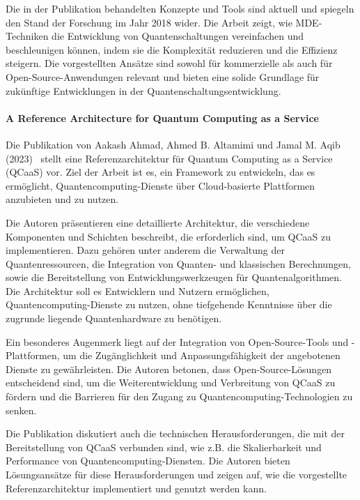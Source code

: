 Die in der Publikation behandelten Konzepte und Tools sind aktuell und spiegeln den Stand der Forschung im Jahr 2018 wider. 
Die Arbeit zeigt, wie MDE-Techniken die Entwicklung von Quantenschaltungen vereinfachen und beschleunigen können, indem 
sie die Komplexität reduzieren und die Effizienz steigern. Die vorgestellten Ansätze sind sowohl für 
kommerzielle als auch für Open-Source-Anwendungen relevant und bieten eine solide Grundlage für zukünftige Entwicklungen in der Quantenschaltungsentwicklung.

\paragraph{A Reference Architecture for Quantum Computing as a Service}

Die Publikation von Aakash Ahmad, Ahmed B. Altamimi und Jamal M. Aqib (2023)~\cite{Ahmad_2023} stellt eine Referenzarchitektur 
für Quantum Computing as a Service (QCaaS) vor. Ziel der Arbeit ist es, ein Framework zu entwickeln, das es ermöglicht, 
Quantencomputing-Dienste über Cloud-basierte Plattformen anzubieten und zu nutzen.

Die Autoren präsentieren eine detaillierte Architektur, die verschiedene Komponenten und Schichten beschreibt, 
die erforderlich sind, um QCaaS zu implementieren. Dazu gehören unter anderem die Verwaltung der 
Quantenressourcen, die Integration von Quanten- und klassischen Berechnungen, sowie die Bereitstellung von 
Entwicklungswerkzeugen für Quantenalgorithmen. Die Architektur soll es Entwicklern und Nutzern 
ermöglichen, Quantencomputing-Dienste zu nutzen, ohne tiefgehende Kenntnisse über die zugrunde liegende Quantenhardware zu benötigen.

Ein besonderes Augenmerk liegt auf der Integration von Open-Source-Tools und -Plattformen, um die 
Zugänglichkeit und Anpassungsfähigkeit der angebotenen Dienste zu gewährleisten. Die Autoren betonen, 
dass Open-Source-Lösungen entscheidend sind, um die Weiterentwicklung und Verbreitung von QCaaS zu fördern und die 
Barrieren für den Zugang zu Quantencomputing-Technologien zu senken.

Die Publikation diskutiert auch die technischen Herausforderungen, die mit der Bereitstellung von QCaaS verbunden sind, 
wie z.B. die Skalierbarkeit und Performance von Quantencomputing-Diensten. Die Autoren bieten Lösungsansätze für diese 
Herausforderungen und zeigen auf, wie die vorgestellte Referenzarchitektur implementiert und genutzt werden kann.

